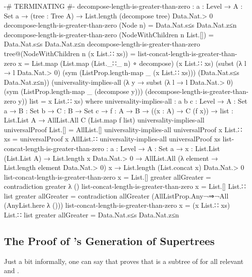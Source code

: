 \documentclass{report}
\begin{document}
\begin{code}
    {-# TERMINATING #-}
    decompose-length-is-greater-than-zero :
      {a : Level} →
      {A : Set a} →
      (tree : Tree A) →
      List.length (decompose tree) Data.Nat.> 0
    decompose-length-is-greater-than-zero (Node n) =
      Data.Nat.s≤s Data.Nat.z≤n
    decompose-length-is-greater-than-zero (NodeWithChildren n List.[]) =
      Data.Nat.s≤s Data.Nat.z≤n
    decompose-length-is-greater-than-zero tree@(NodeWithChildren n (x List.∷ xs)) =
      list-concat-length-is-greater-than-zero
        {x = List.map (List.map (List._∷_ n) ∘ decompose) (x List.∷ xs)}
        (subst (λ l → l Data.Nat.> 0)
               (sym (ListProp.length-map _ (x List.∷ xs)))
               (Data.Nat.s≤s Data.Nat.z≤n))
        (universality-implies-all (λ y → subst (λ l → l Data.Nat.> 0)
                                               (sym (ListProp.length-map _ (decompose y)))
                                               (decompose-length-is-greater-than-zero y))
                                  {list = x List.∷ xs})
      where
      universality-implies-all : {a b c : Level} →
            {A : Set a} →
            {B : Set b} →
            {C : B → Set c} →
            {f : A → B} →
            ((x : A) → C (f x)) →
            {list : List.List A} →
            AllList.All C (List.map f list)
      universality-implies-all universalProof {List.[]} = AllList.[]
      universality-implies-all universalProof {x List.∷ xs} =
        universalProof x AllList.∷ universality-implies-all universalProof {xs}
      list-concat-length-is-greater-than-zero :
        {a : Level} →
        {A : Set a} →
        {x : List.List (List.List A)} →
        List.length x Data.Nat.> 0 →
        AllList.All (λ element → List.length element Data.Nat.> 0) x →
        List.length (List.concat x) Data.Nat.> 0
      list-concat-length-is-greater-than-zero {x = List.[]} greater allGreater =
        contradiction greater λ ()
      list-concat-length-is-greater-than-zero {x = List.[] List.∷ list} greater allGreater =
        contradiction allGreater (AllListProp.Any¬⇒¬All (AnyList.here λ ()))
      list-concat-length-is-greater-than-zero {x = (x List.∷ xs) List.∷ list} greater allGreater =
        Data.Nat.s≤s Data.Nat.z≤n
\end{code}

\subsection{The Proof of 's Generation of Supertrees}
Just a bit informally, one can say that  proves that  is a subtree of    for all relevant  and .
\end{document}
